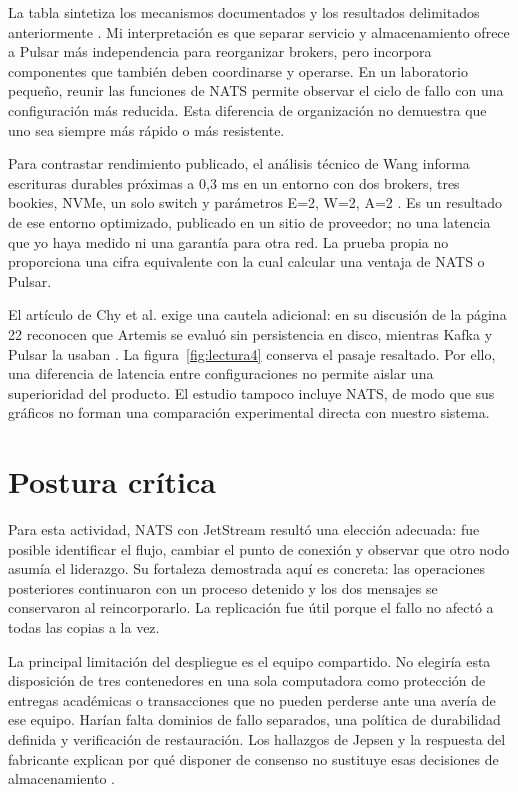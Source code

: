 \documentclass[11pt,a4paper]{article}
\begin{document}
La tabla sintetiza los mecanismos documentados y los resultados delimitados anteriormente \cite{natsCluster,natsReplicacion,vanveen2026,pulsarArquitectura,bookkeeperProtocolo,pulsarGeo,pulsarMensajeria}. Mi interpretación es que separar servicio y almacenamiento ofrece a Pulsar más independencia para reorganizar brokers, pero incorpora componentes que también deben coordinarse y operarse. En un laboratorio pequeño, reunir las funciones de NATS permite observar el ciclo de fallo con una configuración más reducida. Esta diferencia de organización no demuestra que uno sea siempre más rápido o más resistente.

Para contrastar rendimiento publicado, el análisis técnico de Wang informa escrituras durables próximas a 0,3 ms en un entorno con dos brokers, tres bookies, NVMe, un solo switch y parámetros E=2, W=2, A=2 \cite{Wang2025}. Es un resultado de ese entorno optimizado, publicado en un sitio de proveedor; no una latencia que yo haya medido ni una garantía para otra red. La prueba propia no proporciona una cifra equivalente con la cual calcular una ventaja de NATS o Pulsar.

El artículo de Chy et al. exige una cautela adicional: en su discusión de la página 22 reconocen que Artemis se evaluó sin persistencia en disco, mientras Kafka y Pulsar la usaban \cite[p.~22]{Chy2023}. La figura~\ref{fig:lectura4} conserva el pasaje resaltado. Por ello, una diferencia de latencia entre configuraciones no permite aislar una superioridad del producto. El estudio tampoco incluye NATS, de modo que sus gráficos no forman una comparación experimental directa con nuestro sistema.

\section{Postura crítica}
Para esta actividad, NATS con JetStream resultó una elección adecuada: fue posible identificar el flujo, cambiar el punto de conexión y observar que otro nodo asumía el liderazgo. Su fortaleza demostrada aquí es concreta: las operaciones posteriores continuaron con un proceso detenido y los dos mensajes se conservaron al reincorporarlo. La replicación fue útil porque el fallo no afectó a todas las copias a la vez.

La principal limitación del despliegue es el equipo compartido. No elegiría esta disposición de tres contenedores en una sola computadora como protección de entregas académicas o transacciones que no pueden perderse ante una avería de ese equipo. Harían falta dominios de fallo separados, una política de durabilidad definida y verificación de restauración. Los hallazgos de Jepsen y la respuesta del fabricante explican por qué disponer de consenso no sustituye esas decisiones de almacenamiento \cite{Kingsbury2025,Twigg2025}.
\end{document}
